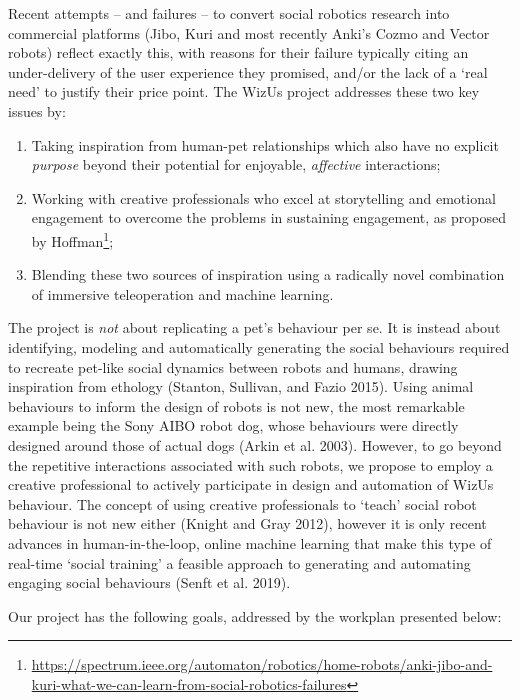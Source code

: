 \documentclass[11pt,a4paper]{report}
\newcommand{\project}{WizUs\xspace}
\begin{document}
Recent attempts -- and failures -- to convert social robotics research
into commercial platforms (Jibo, Kuri and most recently Anki's Cozmo and
Vector robots) reflect exactly this, with reasons for their failure
typically citing an under-delivery of the user experience they promised,
and/or the lack of a `real need' to justify their price point. The
\project project addresses these two key issues by:

\begin{enumerate}
\def\labelenumi{\arabic{enumi}.}
\item
  Taking inspiration from human-pet relationships which also have no
  explicit \emph{purpose} beyond their potential for enjoyable,
  \emph{affective} interactions;
\item
  Working with creative professionals who excel at storytelling and
  emotional engagement to overcome the problems in sustaining
  engagement, as proposed by Hoffman\footnote{\url{https://spectrum.ieee.org/automaton/robotics/home-robots/anki-jibo-and-kuri-what-we-can-learn-from-social-robotics-failures}};
\item
  Blending these two sources of inspiration using a radically novel
  combination of immersive teleoperation and machine learning.
\end{enumerate}

The project is \emph{not} about replicating a pet's behaviour per se. It
is instead about identifying, modeling and automatically generating the
social behaviours required to recreate pet-like social dynamics between
robots and humans, drawing inspiration from ethology (Stanton, Sullivan,
and Fazio 2015). Using animal behaviours to inform the design of robots
is not new, the most remarkable example being the Sony AIBO robot dog,
whose behaviours were directly designed around those of actual dogs
(Arkin et al. 2003). However, to go beyond the repetitive interactions
associated with such robots, we propose to employ a creative
professional to actively participate in design and automation of \project
behaviour. The concept of using creative professionals to `teach' social
robot behaviour is not new either (Knight and Gray 2012), however it is
only recent advances in human-in-the-loop, online machine learning that
make this type of real-time `social training' a feasible approach to
generating and automating engaging social behaviours (Senft et al.
2019).

Our project has the following goals, addressed by the workplan presented
below:
\end{document}
